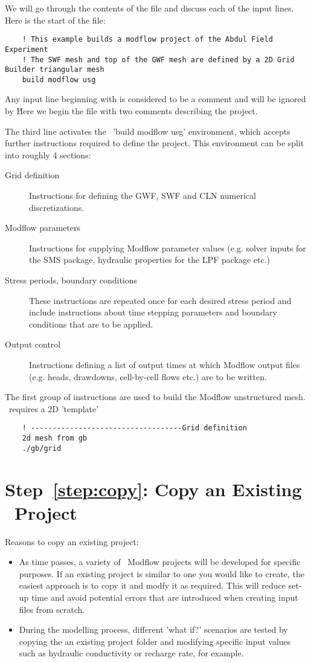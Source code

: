 \label{texfile:Tutorial}
We will go through the contents of the file and discuss each of the input lines.  Here is the start of the file:

\begin{verbatim}
    ! This example builds a modflow project of the Abdul Field Experiment
    ! The SWF mesh and top of the GWF mesh are defined by a 2D Grid Builder triangular mesh
    build modflow usg
\end{verbatim}

Any input line beginning with  is considered to be a comment and will be ignored by \mut\.  Here we begin the file with two comments describing the project.

The third line activates the \mut\ 'build modflow usg' environment, which accepts further instructions required to define the project. This environment can be split into roughly 4 sections:
\begin{description}
    \item[Grid definition] Instructions for defining the GWF, SWF and CLN numerical discretizations.
    \item[Modflow parameters] Instructions for supplying Modflow parameter values (e.g. solver inputs for the SMS package, hydraulic properties for the LPF package etc.)
    \item[Stress periods, boundary conditions] These instructions are repeated once for each desired stress period and include instructions about time stepping parameters and boundary conditions that are to be applied.
    \item[Output control] Instructions defining a list of output times at which Modflow output files (e.g. heads, drawdowns, cell-by-cell flows etc.) are to be written.
\end{description}


The first group of instructions are used to build the Modflow unstructured mesh. \mut\ requires a 2D 'template'

\begin{verbatim}
    ! -----------------------------------Grid definition
    2d mesh from gb
    ./gb/grid
\end{verbatim}

\section*{Step~\ref{step:copy}: Copy an Existing \mut\ Project}
Reasons to copy an existing project:
\begin{itemize}
\item As time passes, a variety of \mut\ Modflow projects will be developed for specific purposes.  If an existing project is similar to one you would like to create, the easiest approach is to copy it and modfy it as required.  This will reduce set-up time and avoid potential errors that are introduced when creating input files from scratch.
\item During the modelling process, different 'what if?' scenarios are tested by copying the an existing project folder and modifying specific input values such as hydraulic conductivity or recharge rate, for example.
\end{itemize}


